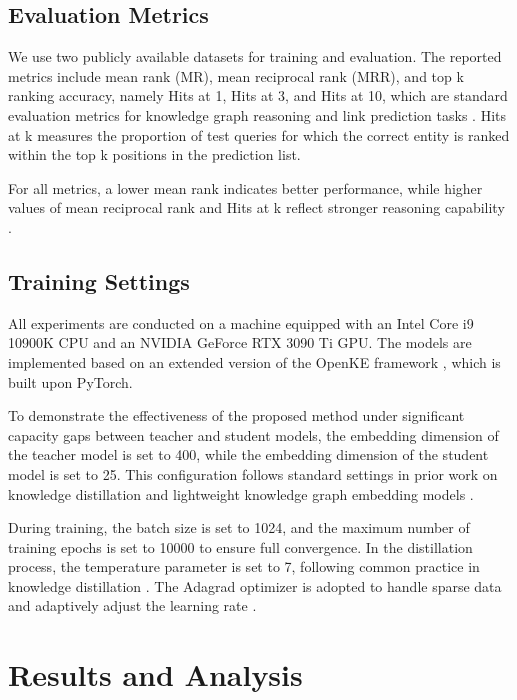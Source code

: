 \documentclass[11pt]{article}
\begin{document}
\subsection{Evaluation Metrics}

We use two publicly available datasets for training and evaluation. The reported metrics include mean rank (MR), mean reciprocal rank (MRR), and top k ranking accuracy, namely Hits at 1, Hits at 3, and Hits at 10, which are standard evaluation metrics for knowledge graph reasoning and link prediction tasks \citep{bordes2013translating, trouillon2016complex}. Hits at k measures the proportion of test queries for which the correct entity is ranked within the top k positions in the prediction list.

For all metrics, a lower mean rank indicates better performance, while higher values of mean reciprocal rank and Hits at k reflect stronger reasoning capability \citep{sun2019rotate}.

\subsection{Training Settings}

All experiments are conducted on a machine equipped with an Intel Core i9 10900K CPU and an NVIDIA GeForce RTX 3090 Ti GPU. The models are implemented based on an extended version of the OpenKE framework \citep{han2018openke}, which is built upon PyTorch.

To demonstrate the effectiveness of the proposed method under significant capacity gaps between teacher and student models, the embedding dimension of the teacher model is set to 400, while the embedding dimension of the student model is set to 25. This configuration follows standard settings in prior work on knowledge distillation and lightweight knowledge graph embedding models \citep{hinton2015distilling}.

During training, the batch size is set to 1024, and the maximum number of training epochs is set to 10000 to ensure full convergence. In the distillation process, the temperature parameter is set to 7, following common practice in knowledge distillation \citep{hinton2015distilling}. The Adagrad optimizer is adopted to handle sparse data and adaptively adjust the learning rate \citep{duchi2011adaptive}.


\section{Results and Analysis}
\end{document}
